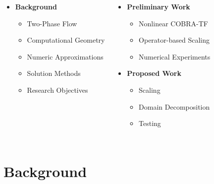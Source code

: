 \documentclass[compress,xcolor=table]{beamer}
\newlength{\hpw}
\begin{document}
\begin{frame}

\begin{columns}
\column{\hpw}
\begin{itemize}
\item{\textbf{Background}
\begin{itemize}
\item{Two-Phase Flow}
\item{Computational Geometry}
\item{Numeric Approximations}
\item{Solution Methods}
\item{Research Objectives}
\end{itemize}
}
\end{itemize}

\column{\hpw}
\begin{itemize}
\item{\textbf{Preliminary Work}
\begin{itemize}
\item{Nonlinear COBRA-TF}
\item{Operator-based Scaling}
\item{Numerical Experiments}
\end{itemize}
}
\item{\textbf{Proposed Work}
\begin{itemize}
\item{Scaling}
\item{Domain Decomposition}
\item{Testing}
\end{itemize}
}
\end{itemize}

\end{columns}
\end{frame}
\section[Background]{Background}
\end{document}
